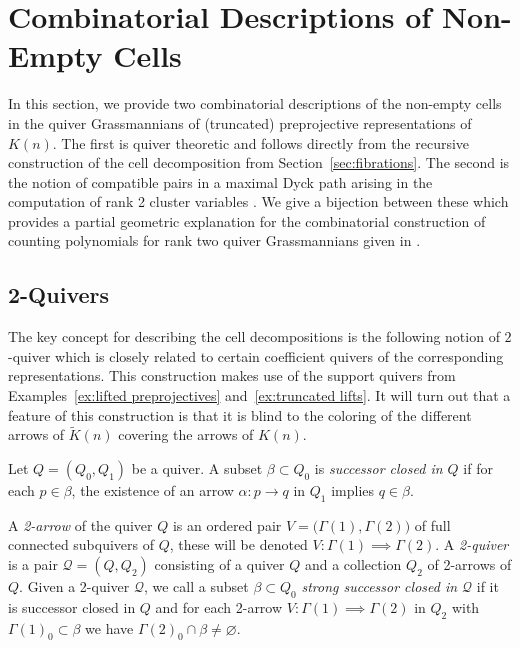 \documentclass[smallextended,envcountsect,envcountsame]{svjour3}
\numberwithin{equation}{section}
\newcommand{\cQ}{\mathcal{Q}}
\begin{document}
\section{Combinatorial Descriptions of Non-Empty Cells}
\label{sec:combinatorics}

\noindent 
In this section, we provide two combinatorial descriptions of the non-empty cells in the quiver Grassmannians of (truncated) preprojective representations of $K(n)$.
The first is quiver theoretic and follows directly from the recursive construction of the cell decomposition from Section~\ref{sec:fibrations}.
The second is the notion of compatible pairs in a maximal Dyck path arising in the computation of rank 2 cluster variables \cite{llz}.
We give a bijection between these which provides a partial geometric explanation for the combinatorial construction of counting polynomials for rank two quiver Grassmannians given in \cite{rupel}.


\subsection{2-Quivers}
\label{sec:2quivers}

The key concept for describing the cell decompositions is the following notion of $2$-quiver which is closely related to certain coefficient quivers of the corresponding representations.
This construction makes use of the support quivers from Examples~\ref{ex:lifted preprojectives} and~\ref{ex:truncated lifts}.
It will turn out that a feature of this construction is that it is blind to the coloring of the different arrows of $\widetilde K(n)$ covering the arrows of $K(n)$.
\begin{definition}
  Let $Q=(Q_0,Q_1)$ be a quiver.
  A subset $\beta\subset Q_0$ is \emph{successor closed in $Q$} if for each $p\in\beta$, the existence of an arrow $\alpha:p\to q$ in $Q_1$ implies $q\in\beta$.

  A \emph{2-arrow} of the quiver $Q$ is an ordered pair $V=\big(\Gamma(1),\Gamma(2)\big)$ of full connected subquivers of $Q$, these will be denoted $V:\Gamma(1)\implies\Gamma(2)$.
  A \emph{2-quiver} is a pair $\cQ=(Q,Q_2)$ consisting of a quiver $Q$ and a collection $Q_2$ of 2-arrows of $Q$.
  Given a 2-quiver $\cQ$, we call a subset $\beta\subset Q_0$ \emph{strong successor closed in $\cQ$} if it is successor closed in $Q$ and for each 2-arrow $V:\Gamma(1)\implies\Gamma(2)$ in $Q_2$ with $\Gamma(1)_0\subset\beta$ we have $\Gamma(2)_0\cap\beta\ne\varnothing$.  
\end{definition}
\end{document}
